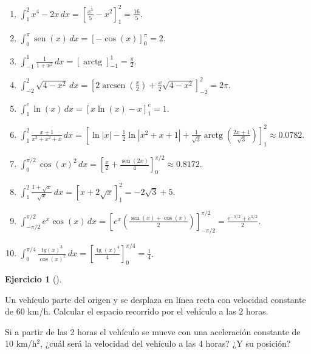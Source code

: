 \documentclass[
  a4paper,
]{scrreport}
\theoremstyle{definition}
\newtheorem{exercise}{Ejercicio}[chapter]
\theoremstyle{remark}
\begin{document}
\begin{tcolorbox}[enhanced jigsaw, coltitle=black, toptitle=1mm, colframe=quarto-callout-tip-color-frame, colbacktitle=quarto-callout-tip-color!10!white, breakable, opacityback=0, bottomtitle=1mm, opacitybacktitle=0.6, title=\textcolor{quarto-callout-tip-color}{\faLightbulb}\hspace{0.5em}{Solución}, arc=.35mm, leftrule=.75mm, toprule=.15mm, titlerule=0mm, bottomrule=.15mm, left=2mm, rightrule=.15mm, colback=white]

\begin{enumerate}
\def\labelenumi{\alph{enumi}.}
\item
  \(\int_1^2 x^4-2x\,dx = \left[\frac{x^5}{5}-x^2\right]_1^2 = \frac{16}{5}\).
\item
  \(\int_0^{\pi} \operatorname{sen}(x)\, dx = \left[-\cos(x)\right]_0^\pi = 2\).
\item
  \(\int_{-1}^1 \frac{1}{1+x^2}\,dx = \left[\operatorname{arctg}\right]_{-1}^1 = \frac{\pi}{2}\).
\item
  \(\int_{-2}^2 \sqrt{4-x^2}\,dx = \left[2\operatorname{arcsen}\left(\frac{x}{2}\right)+\frac{x}{2}\sqrt{4-x^2}\right]_{-2}^2 = 2\pi\).
\item
  \(\int_1^e \ln(x)\,dx = \left[x\ln(x)-x\right]_1^e = 1\).
\item
  \(\int_1^2 \frac{x+1}{x^3+x^2+x}\,dx = \left[\ln|x| - \frac{1}{2}\ln|x^2+x+1|+\frac{1}{\sqrt{3}}\operatorname{arctg}\left(\frac{2x+1}{\sqrt{3}}\right) \right]_1^2 \approx 0.0782.\)
\item
  \(\int_0^{\pi/2} \cos(x)^2\, dx = \left[\frac{x}{2}+\frac{\operatorname{sen}(2x)}{4}\right]_0^{\pi/2} \approx 0.8172.\)
\item
  \(\int_1^2 \frac{1+\sqrt{x}}{\sqrt{x}}\,dx = \left[x+2\sqrt{x}\right]_1^2 = -2\sqrt{3}+5\).
\item
  \(\int_{-\pi/2}^{\pi/2} e^x\cos(x)\,dx = \left[e^x\left(\frac{\operatorname{sen}(x)+\cos(x)}{2}\right)\right]_{-\pi/2}^{\pi/2} = \frac{e^{-\pi/2}+e^{\pi/2}}{2}\).
\item
  \(\int_{0}^{\pi/4}\frac{tg(x)^3}{\cos(x)^2}\,dx = \left[\frac{\operatorname{tg}(x)^4}{4}\right]_0^{\pi/4} = \frac{1}{4}\).
\end{enumerate}

\end{tcolorbox}

\begin{exercise}[]\protect\hypertarget{exr-espacio-recorrido-movil}{}\label{exr-espacio-recorrido-movil}

Un vehículo parte del origen y se desplaza en línea recta con velocidad
constante de 60 km/h. Calcular el espacio recorrido por el vehículo a
las 2 horas.

Si a partir de las 2 horas el vehículo se mueve con una aceleración
constante de 10 km/h\(^2\), ¿cuál será la velocidad del vehículo a las 4
horas? ¿Y su posición?

\end{exercise}
\end{document}
